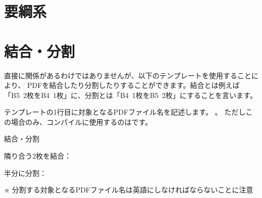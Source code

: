 \begin{multicols*}{2}
\section{要綱系}

\section{結合・分割}
直接\BunTeX に関係があるわけではありませんが、以下のテンプレートを使用することにより、
PDFを結合したり分割したりすることができます。結合とは例えば「B5~2枚をB4~1枚」に、分割とは「B4~1枚をB5~2枚」にすることを言います。

テンプレートの1行目に対象となるPDFファイル名を記述します。
。
ただしこの場合のみ、コンパイルに使用するのはです。

\begin{framebox-simple}{結合・分割}
\begin{reitemize}
    \item 隣り合う2枚を結合：
    \item 半分に分割：
\end{reitemize}
\noindent ※ 分割する対象となるPDFファイル名は英語にしなければならないことに注意
\end{framebox-simple}

\end{multicols*}